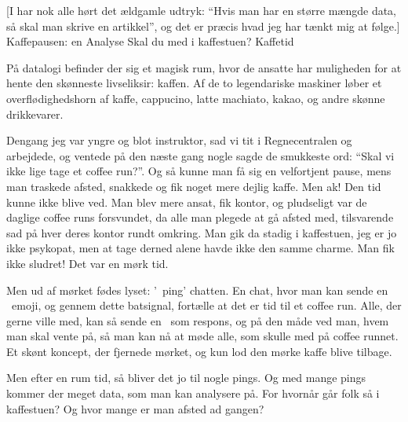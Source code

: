 \begin{article}
[I har nok alle hørt det ældgamle udtryk: ``Hvis man har en større mængde data, så skal man skrive en \madsfoek artikkel'', og det er præcis hvad jeg har tænkt mig at følge.]
{Kaffepausen: en Analyse}
{Skal du med i kaffestuen?}
{Kaffetid \protect\coffee\ }

\renewcommand{\figurename}{Figur.}


På datalogi befinder der sig et magisk rum, hvor de ansatte har muligheden for at hente den skønneste livseliksir: kaffen. Af de to legendariske maskiner løber et overflødighedshorn af kaffe, cappucino, latte machiato, kakao, og andre skønne drikkevarer.

Dengang jeg var yngre og blot instruktor, sad vi tit i Regnecentralen og arbejdede, og ventede på den næste gang nogle sagde de smukkeste ord: ``Skal vi ikke lige tage et coffee run?''. Og så kunne man få sig en velfortjent pause, mens man traskede afsted, snakkede og fik noget mere dejlig kaffe. Men ak! Den tid kunne ikke blive ved. Man blev mere ansat, fik kontor, og pludseligt var de daglige coffee runs forsvundet, da alle man plegede at gå afsted med, tilsvarende sad på hver deres kontor rundt omkring. Man gik da stadig i kaffestuen, jeg er jo ikke psykopat, men at tage derned alene havde ikke den samme charme. Man fik ikke sludret! Det var en mørk tid.

Men ud af mørket fødes lyset: '\coffee\ ping' chatten.
En chat, hvor man kan sende en \coffee\ emoji, og gennem dette batsignal, fortælle at det er tid til et coffee run. Alle, der gerne ville med, kan så sende en \coffee\ som respons, og på den måde ved man, hvem man skal vente på, så man kan nå at møde alle, som skulle med på coffee runnet. Et skønt koncept, der fjernede mørket, og kun lod den mørke kaffe blive tilbage.

Men efter en rum tid, så bliver det jo til nogle pings. Og med mange pings kommer der meget data, som man kan analysere på. For hvornår går folk så i kaffestuen? Og hvor mange er man afsted ad gangen?



\end{article}

